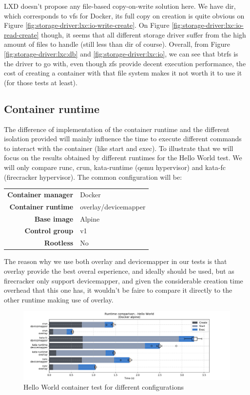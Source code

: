 LXD doesn't propose any file-based copy-on-write solution here.  We have dir, which corresponds to vfs for Docker, its full copy on creation is quite obvious on Figure \ref{fig:storage-driver:lxc:io-write-create}.  On Figure \ref{fig:storage-driver:lxc:io-read-create} though, it seems that all different storage driver suffer from the high amount of files to handle (still less than dir of course).  Overall, from Figure \ref{fig:storage-driver:lxc:db} and \ref{fig:storage-driver:lxc:io}, we can see that btrfs is the driver to go with, even though zfs provide decent execution performance, the cost of creating a container with that file system makes it not worth it to use it (for those tests at least).

\subsection{Container runtime}
The difference of implementation of the container runtime and the different isolation provided will mainly influence the time to execute different commands to interact with the container (like start and exec).  To illustrate that we will focus on the results obtained by different runtimes for the Hello World test.  We will only compare runc, crun, kata-runtime (qemu hypervisor) and kata-fc (firecracker hypervisor).  The common configuration will be:

\begin{tabular}{rl}
   \textbf{Container manager} & Docker \\
   \textbf{Container runtime} & overlay/devicemapper \\
   \textbf{Base image} & Alpine \\
   \textbf{Control group} & v1 \\
   \textbf{Rootless} & No 
\end{tabular}

The reason why we use both overlay and devicemapper in our tests is that overlay provide the best overal esperience, and ideally should be used, but as firecracker only support devicemapper, and given the considerable creation time overhead that this one has, it wouldn't be faire to compare it directly to the other runtime making use of overlay.

\begin{figure}[h!]
  \begin{center}
    \includegraphics[width=\linewidth]{images/runtime/runtime-Hello-World-Docker-alpine.png}
    \caption{Hello World container test for different configurations}
    \label{fig:runtime:hello-world}
  \end{center}
\end{figure}


